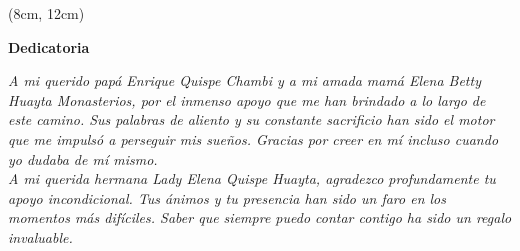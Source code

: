 \begin{titlepage}
  \null
  \vfill
  \begin{textblock*}{10cm}(8cm, 12cm)
    \begin{flushright}
      \large \textbf{Dedicatoria}
    \end{flushright}
    \noindent
    \textit{A mi querido papá Enrique Quispe Chambi y a mi amada mamá Elena Betty Huayta Monasterios, por el inmenso apoyo que me han brindado a lo largo de este camino. Sus palabras de aliento y su constante sacrificio han sido el motor que me impulsó a perseguir mis sueños. Gracias por creer en mí incluso cuando yo dudaba de mí mismo. \\}
    \textit{A mi querida hermana Lady Elena Quispe Huayta, agradezco profundamente tu apoyo incondicional. Tus ánimos y tu presencia han sido un faro en los momentos más difíciles. Saber que siempre puedo contar contigo ha sido un regalo invaluable.}
  \end{textblock*}
  \vfill
  \null
\end{titlepage}
